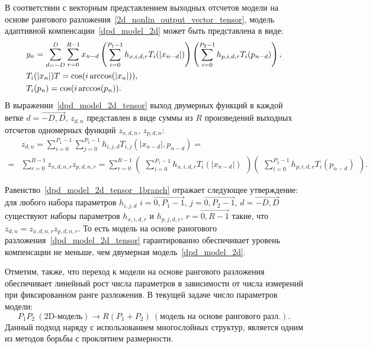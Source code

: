 В соответствии с векторным представлением выходных отсчетов модели на основе рангового разложения~\eqref{2d_nonlin_output_vector_tensor}, модель адаптивной компенсации~\eqref{dpd_model_2d} может быть представлена в виде:
\begin{align}
	\displaystyle &y_n=\sum_{d=-D}^{D}\sum_{r=0}^{R-1}x_{n-d}
	\begin{pmatrix}
		\displaystyle \sum_{i=0}^{P_1-1}h_{x, i, d, r}T_{i}(|x_{n-d}|)
	\end{pmatrix}
	\begin{pmatrix}
		\displaystyle \sum_{i=0}^{P_2-1}h_{p, i, d, r}T_{i}(p_{n-d})
	\end{pmatrix}, \nonumber \\
	\displaystyle &T_{i}(|x_n|)T=\cos(i\arccos(|x_n|)), \nonumber \\
	\displaystyle &T_{i}(p_n)=\cos(i\arccos(p_n)).
	\label{dpd_model_2d_tensor}
\end{align}
В выражении~\eqref{dpd_model_2d_tensor} выход двумерных функций в каждой ветке $d=\overrightarrow{-D, D}$, $z_{d, n}$ представлен в виде суммы из $R$ произведений выходных отсчетов одномерных функций $z_{x, d, n}$, $z_{p, d, n}$:
\begin{align}
	&z_{d, n}=\sum_{i=0}^{P_1-1}\sum_{j=0}^{P_2-1}h_{i, j, d}T_{i, j}(|x_{n-d}|, p_{n-d})= \nonumber \\
	=&\sum_{r=0}^{R-1}z_{x, d, n, r}z_{p, d, n, r}=\displaystyle
	\sum_{r=0}^{R-1}
	\begin{pmatrix}
		\displaystyle \sum_{i=0}^{P_1-1}h_{x, i, d, r}T_{i}(|x_{n-d}|)
	\end{pmatrix}
	\begin{pmatrix}
		\displaystyle \sum_{i=0}^{P_2-1}h_{p, i, d, r}T_{i}(p_{n-d})
	\end{pmatrix}.
	\label{dpd_model_2d_tensor_1branch}
\end{align}

Равенство~\eqref{dpd_model_2d_tensor_1branch} отражает следующее утверждение: для любого набора параметров $h_{i, j, d}$ $i=\overrightarrow{0, P_1-1}$, $j=\overrightarrow{0, P_2-1}$, $d=\overrightarrow{-D, D}$ существуют наборы параметров $h_{x, i, d, r}$ и $h_{p, j, d, r}$, $r=\overrightarrow{0, R-1}$ такие, что $z_{d, n}=z_{x, d, n, r}z_{p, d, n, r}$. То есть модель на основе раногового разложения~\eqref{dpd_model_2d_tensor} гарантированно обеспечивает уровень компенсации не меньше, чем двумерная модель~\eqref{dpd_model_2d}.

Отметим, также, что переход к модели на основе рангового разложения обеспечивает линейный рост числа параметров в зависимости от числа измерений при фиксированном ранге разложения. В текущей задаче число параметров модели:
\begin{equation}
	P_1P_2 \ (\text{2D-модель}) \rightarrow R(P_1+P_2) \ (\text{модель на основе рангового разл.}).
	\label{dimens_curse_solution}
\end{equation}
Данный подход наряду с использованием многослойных структур, является одним из методов борьбы с проклятием размерности.

